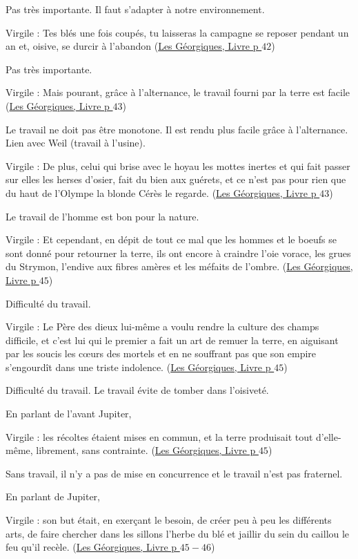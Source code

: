 \documentclass[a4paper, 11pt, hidelinks]{article}
\newcommand{\bs}{\bigskip}
\newcommand{\rb}[1]{\Romanbar{#1}}
\newcommand{\citer}[3]{\bs \begin{center} \textcolor{authorGray}{#1 :} \textcolor{citationRed}{\og #2 \fg} \textcolor{authorGray}{(\underline{#3})} \end{center} \bs}
\begin{document}
Pas très importante.
Il faut s'adapter à notre environnement.


\citer{Virgile}{Tes blés une fois coupés, tu laisseras la campagne se reposer pendant un an et, oisive, se durcir à l'abandon}{Les Géorgiques, Livre \rb{1} p $42$}


Pas très importante.


\citer{Virgile}{Mais pourant, grâce à l'alternance, le travail fourni par la terre est facile}{Les Géorgiques, Livre \rb{1} p $43$}


Le travail ne doit pas être monotone. Il est rendu plus facile grâce à l'alternance. Lien avec Weil (travail à l'usine).


\citer{Virgile}{De plus, celui qui brise avec le hoyau les mottes inertes et qui fait passer sur elles les herses d'osier, fait
du bien aux guérets, et ce n'est pas pour rien que du haut de l'Olympe la blonde Cérès le regarde.}{Les Géorgiques, Livre \rb{1} p $43$}


Le travail de l'homme est bon pour la nature.


\citer{Virgile}{Et cependant, en dépit de tout ce mal que les hommes et le boeufs se sont donné pour retourner la terre, ils ont encore 
à craindre l'oie vorace, les grues du Strymon, l'endive aux fibres amères et les méfaits de l'ombre.}{Les Géorgiques, Livre \rb{1} p $45$}


Difficulté du travail.


\citer{Virgile}{Le Père des dieux lui-même a voulu rendre la culture des champs difficile, et c'est lui qui le premier a fait un art 
de remuer la terre, en aiguisant par les soucis les c\oe urs des mortels et en ne souffrant pas que son empire s'engourdît dans une 
triste indolence.}{Les Géorgiques, Livre \rb{1} p $45$}


Difficulté du travail. Le travail évite de tomber dans l'oisiveté.


En parlant de l'avant Jupiter, \citer{Virgile}{les récoltes étaient mises en commun, et la terre produisait tout d'elle-même, 
librement, sans contrainte.}{Les Géorgiques, Livre \rb{1} p $45$}


Sans travail, il n'y a pas de mise en concurrence et le travail n'est pas fraternel.


En parlant de Jupiter, \citer{Virgile}{son but était, en exerçant le besoin, de créer peu à peu les différents arts, de faire 
chercher dans les sillons l'herbe du blé et jaillir du sein du caillou le feu qu'il recèle.}{Les Géorgiques, Livre \rb{1} p $45-46$}
\end{document}
